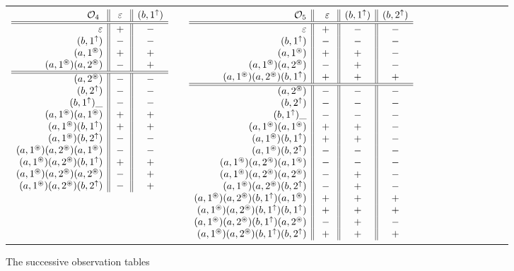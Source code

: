 \documentclass{LMCS}
\newcommand{\rreg}[1]{#1^\uparrow}
\newcommand{\gfresh}[1]{#1^\circledast}
\begin{document}
\begin{figure}[ht]
\begin{center}
{\begin{tabular}{llllllllllll}
$
\begin{array}[t]{r||c||c}
\mathcal O_4~& ~\varepsilon~ & (b,\rreg{1})\\\hline\hline
\varepsilon&+&-\\
(b,\rreg{1})&-&-\\
(a,\gfresh{1})&+&+\\
(a,\gfresh{1})(a,\gfresh{2})&-&+\\
\hline\hline
(a,\gfresh{2})&-&-\\
(b,\rreg{2})&-&-\\
(b,\rreg{1})\_ &-&-\\
(a,\gfresh{1})(a,\gfresh{1})&+&+\\
(a,\gfresh{1})(b,\rreg{1})&+&+\\
(a,\gfresh{1})(b,\rreg{2})&-&-\\
(a,\gfresh{1})(a,\gfresh{2})(a,\gfresh{1})&-&-\\
(a,\gfresh{1})(a,\gfresh{2})(b,\rreg{1})&+&+\\
(a,\gfresh{1})(a,\gfresh{2})(a,\gfresh{2})&-&+\\
(a,\gfresh{1})(a,\gfresh{2})(b,\rreg{2})&-&+\\
\end{array}
$
&\raisebox{-2ex}{$\Rightarrow$}&
$
\begin{array}[t]{r||c||c||c}
\mathcal O_5& ~~\varepsilon~ & (b,\rreg{1})&(b,\rreg{2})\\\hline\hline
\varepsilon&+&-&-\\
(b,\rreg{1})&-&-&-\\
(a,\gfresh{1})&+&+&-\\
(a,\gfresh{1})(a,\gfresh{2})&-&+&-\\
(a,\gfresh{1})(a,\gfresh{2})(b,\rreg{1})&+&+&+\\
\hline\hline
(a,\gfresh{2})&-&-&-\\
(b,\rreg{2})&-&-&-\\
(b,\rreg{1})\_ &-&-&-\\
(a,\gfresh{1})(a,\gfresh{1})&+&+&-\\
(a,\gfresh{1})(b,\rreg{1})&+&+&-\\
(a,\gfresh{1})(b,\rreg{2})&-&-&-\\
(a,\gfresh{1})(a,\gfresh{2})(a,\gfresh{1})&-&-&-\\
(a,\gfresh{1})(a,\gfresh{2})(a,\gfresh{2})&-&+&-\\
(a,\gfresh{1})(a,\gfresh{2})(b,\rreg{2})&-&+&-\\
(a,\gfresh{1})(a,\gfresh{2})(b,\rreg{1})(a,\gfresh{1})&+&+&+\\
(a,\gfresh{1})(a,\gfresh{2})(b,\rreg{1})(b,\rreg{1})&+&+&+\\
(a,\gfresh{1})(a,\gfresh{2})(b,\rreg{1})(a,\gfresh{2})&-&+&-\\
(a,\gfresh{1})(a,\gfresh{2})(b,\rreg{1})(b,\rreg{2})&+&+&+\\
\end{array}
$
\end{tabular}}
\end{center}
\caption{\label{fig:learning}The successive observation tables}
\end{figure}
\end{document}
